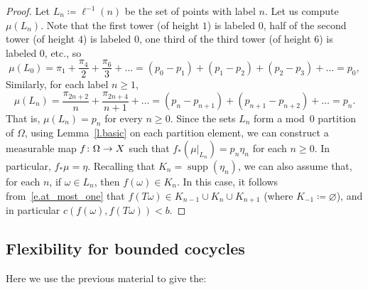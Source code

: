 \documentclass[AHL,Unicode,longabstracts,published]{cedram}
\DeclareMathOperator{\supp}{supp}
\renewcommand{\emptyset}{\varnothing}
\renewcommand*{\to}{\mathchoice{\longrightarrow}{\rightarrow}{\rightarrow}{\rightarrow}}
\begin{document}
\begin{proof}
Let $L_n \coloneq \ell^{-1}(n)$ be the set of points with label $n$. Let us compute $\mu(L_n)$. Note that the first tower (of height $1$) is labeled $0$, half of the second tower (of height $4$) is labeled $0$, one third of the third tower (of height $6$) is labeled $0$, etc., so
\begin{equation}
\mu(L_0) = \pi_1 + \frac{\pi_4}{2} + \frac{\pi_6}{3} + \dots = (p_0-p_1) + (p_1-p_2) + (p_2-p_3) + \dots = p_0,
\end{equation}
Similarly, for each label $n\ge 1$,
\begin{equation}
\mu(L_n) = \frac{\pi_{2n+2}}{n} + \frac{\pi_{2n+4}}{n+1} + \dots = (p_n - p_{n+1}) + (p_{n+1} - p_{n+2}) + \dots = p_n.
\end{equation}
That is, $\mu(L_n) = p_n$ for every $n \ge 0$. Since the sets $L_n$ form a mod~$0$ partition of $\Omega$, using Lemma~\ref{l.basic} on each partition element, we can construct a measurable map $f \colon \Omega \to X$ such that $f_* (\mu|_{L_n}) = p_n \eta_n$ for each $n \ge 0$. In particular, $f_*\mu = \eta$. Recalling that $K_n = \supp(\eta_n)$, we can also assume that, for each $n$, if $\omega \in L_n$, then $f(\omega) \in K_n$. In this case, it follows from~\eqref{e.at_most_one} that $f(T \omega) \in K_{n-1} \cup K_n \cup K_{n+1}$ (where $K_{-1} \coloneq \emptyset$), and in particular $c(f(\omega),f(T \omega)) < b $.
\end{proof}


\pagebreak{}
\subsection{Flexibility for bounded cocycles}\label{ss.bounded}

Here we use the previous material to give the:
\end{document}

